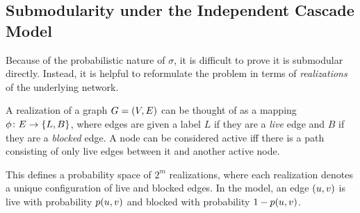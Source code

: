 \subsection{Submodularity under the Independent Cascade Model}
Because of the probabilistic nature of $\sigma$, it is difficult to prove it is submodular directly. Instead, it is helpful to reformulate the problem in terms of \emph{realizations} of the underlying network.

\begin{definition}[Realization]
    A realization of a graph $G = \left( V, E \right)$ can be thought of as a mapping $\phi\colon E 
    \to \left\{ L, B \right\}$, where edges are given a label $L$ if they are a \emph{live} edge and $B$ if they are a \emph{blocked} edge. A node can be considered active iff there is a path consisting of only live edges between it and another active node. 
    \label{def:realization}
\end{definition}

This defines a probability space of $2^m$ realizations, where each realization denotes a unique configuration of live and blocked edges. 
In the \icmodel{} model, an edge $\left( u, v \right)$ is live with probability $p \! \left( u,v \right)$ and blocked with probability $1 - p \! \left( u,v \right)$. 

